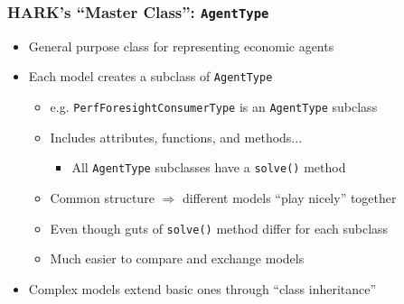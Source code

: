 \documentclass[public]{beamer}\beamerdefaultoverlayspecification{<+->}
\providecommand{\OSMCDCHideBegin}{\ifthenelse{\boolean{OSMCDC}}{\setboolean{includeTF}{false}}{}}
\newcommand{\ifInclude}[1]{\ifthenelse{\boolean{includeTF}}{#1}}
\begin{document}
\begin{frame}
  \frametitle{HARK's ``Master Class'': \texttt{AgentType}}
  \begin{itemize}
  \item General purpose class for representing economic agents
    \pause
  \item Each model creates a subclass of \texttt{AgentType}
    \begin{itemize}
    \item e.g. \texttt{PerfForesightConsumerType} is an \texttt{AgentType} subclass 
    \item Includes attributes, functions, and methods...
      \begin{itemize}
      \item All \texttt{AgentType} subclasses have a \texttt{solve()} method
      \end{itemize}
      
    \end{itemize}
    \begin{itemize}
    \item Common structure $\Rightarrow$  different models ``play nicely'' together
    \item Even though guts of \texttt{solve()} method differ for each subclass
    \item Much easier to compare and exchange models
    \end{itemize}
  \item Complex models extend basic ones through ``class inheritance''
  \end{itemize}
\end{frame}




\end{document}
